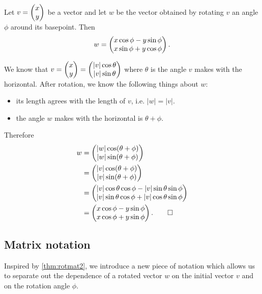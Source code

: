\documentclass{article}
\begin{document}
\begin{Theorem}\label{thm:rotmat2}
Let \(v=\begin{pmatrix} x \\ y \end{pmatrix}\) be a vector and let \(w\) be the vector
obtained by rotating \(v\) an angle \(\phi\) around its
basepoint. Then \[w=\begin{pmatrix} x\cos\phi - y\sin\phi \\ x\sin\phi +
y\cos\phi \end{pmatrix}.\]
\end{Theorem}
\begin{Proof}
We know that \(v=\begin{pmatrix} x \\ y \end{pmatrix}=\begin{pmatrix} |v|\cos\theta
\\ |v|\sin\theta\end{pmatrix}\) where \(\theta\) is the angle \(v\) makes with
the horizontal. After rotation, we know the following things about
\(w\):
\begin{itemize}
\item its length agrees with the length of \(v\), i.e. \(|w|=|v|\).
\item the angle \(w\) makes with the horizontal is \(\theta+\phi\).
\end{itemize}
Therefore
\begin{align*}
w&=\begin{pmatrix} |w|\cos(\theta+\phi) \\ |w|\sin(\theta+\phi)\end{pmatrix}\\
&=\begin{pmatrix} |v|\cos(\theta+\phi) \\ |v|\sin(\theta+\phi)\end{pmatrix}\\
&=\begin{pmatrix} |v|\cos\theta\cos\phi-|v|\sin\theta\sin\phi \\
|v|\sin\theta\cos\phi+|v|\cos\theta\sin\phi\end{pmatrix}\\
&=\begin{pmatrix} x\cos\phi-y\sin\phi \\ x\cos\phi+y\sin\phi\end{pmatrix}.\qedhere
\end{align*}


\end{Proof}
\subsection{Matrix notation}


Inspired by \cref{thm:rotmat2}, we introduce a new piece of notation
which allows us to separate out the dependence of a rotated vector
\(w\) on the initial vector \(v\) and on the rotation angle \(\phi\).
\end{document}
